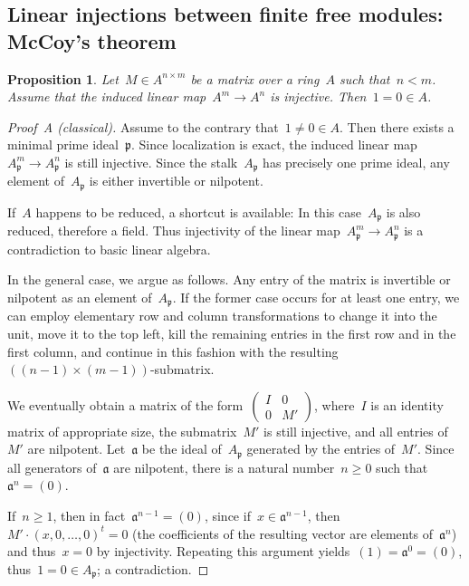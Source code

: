 \documentclass{amsart}
\theoremstyle{definition}
\theoremstyle{plain}
\newtheorem{prop}[defn]{Proposition}
\theoremstyle{remark}
\newcommand{\aaa}{\mathfrak{a}}
\newcommand{\ppp}{\mathfrak{p}}
\newcommand{\?}{\,{:}\,}
\begin{document}
\subsection{Linear injections between finite free modules: McCoy's theorem}

\begin{prop}\label{injection}
Let~$M \in A^{n \times m}$ be a matrix over a ring~$A$ such that~$n
< m$. Assume that the induced linear map~$A^m \to A^n$ is injective. Then~$1 =
0 \in A$.
\end{prop}

\begin{proof}[Proof~A (classical)]
Assume to the contrary that~$1 \neq 0 \in A$. Then there exists a minimal prime
ideal~$\ppp$. Since localization is exact, the induced linear map~$A_\ppp^m \to
A_\ppp^n$ is still injective. Since the stalk~$A_\ppp$ has precisely one prime
ideal, any element of~$A_\ppp$ is either invertible or nilpotent.

If~$A$ happens to be reduced, a shortcut is available: In this case~$A_\ppp$ is
also reduced, therefore a field. Thus injectivity of the linear map~$A_\ppp^m
\to A_\ppp^n$ is a contradiction to basic linear algebra.

In the general case, we argue as follows. Any entry of the matrix is invertible
or nilpotent as an element of~$A_\ppp$. If the former case occurs for at least
one entry, we can employ elementary row and column transformations to change it
into the unit, move it to the top left, kill the remaining entries in the first
row and in the first column, and continue in this fashion with the
resulting~$((n-1) \times (m-1))$-submatrix.

We eventually obtain a matrix of the
form~$\left(\begin{smallmatrix}I&0\\0&M'\end{smallmatrix}\right)$, where~$I$ is
an identity matrix of appropriate size, the submatrix~$M'$ is still injective,
and all entries of~$M'$ are nilpotent. Let~$\aaa$ be the ideal of~$A_\ppp$
generated by the entries of~$M'$. Since all generators of~$\aaa$ are nilpotent,
there is a natural number~$n \geq 0$ such that~$\aaa^n = (0)$.

If~$n \geq 1$, then in fact~$\aaa^{n-1} = (0)$, since if~$x \in \aaa^{n-1}$,
then~$M' \cdot (x,0,\ldots,0)^t = 0$ (the coefficients of the resulting vector are
elements of~$\aaa^n$) and thus~$x = 0$ by injectivity. Repeating this argument
yields~$(1) = \aaa^0 = (0)$, thus~$1 = 0 \in A_\ppp$; a contradiction.
\end{proof}
\end{document}
